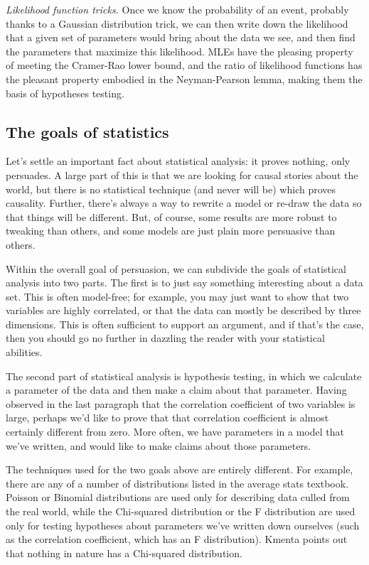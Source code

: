 \documentclass[12pt,notitlepage, openany]{book}
\begin{document}
{\it Likelihood function tricks.} Once we know the probability of an
event, probably thanks to a Gaussian distribution trick, we can then
write down the likelihood that a given set of parameters would bring
about the data we see, and then find the parameters that maximize this
likelihood. MLEs have the pleasing property of meeting the Cramer-Rao
lower bound, and the ratio of likelihood functions has the pleasant
property embodied in the Neyman-Pearson lemma, making them the basis of
hypotheses testing.

\subsection{The goals of statistics} Let's settle an
important fact about statistical analysis: it proves nothing, only
persuades. A large part of this is that we are looking for causal stories
about the world, but there is no statistical technique (and never will be)
which proves causality. Further, there's always a way to rewrite a model
or re-draw the data so that things will be different. But, of course,
some results are more robust to tweaking 
than others, and some models are just plain more persuasive than others.

Within the overall goal of persuasion, we can subdivide the goals of
statistical analysis into two parts. The first is to just say something
interesting about a data set. This is often model-free; for example,
you may just want to show that two variables are highly correlated, or
that the data can mostly be described by three dimensions. This is often
sufficient to support an argument, and if that's the case, then you should
go no further in dazzling the reader with your statistical abilities.

The second part of statistical analysis is hypothesis testing, in which
we calculate a parameter of the data and then make a claim about that
parameter.  Having observed in the last paragraph that the correlation
coefficient of two variables is large, perhaps we'd like to prove
that that correlation coefficient is almost certainly different from
zero. More often, we have parameters in a model that we've written,
and would like to make claims about those parameters.

The techniques used for the two goals above are entirely different. For
example, there are any of a number of distributions listed in the
average stats textbook.  Poisson or Binomial distributions are used
only for describing data culled from the real world, while the Chi-squared
distribution or the F distribution are used only for testing hypotheses
about parameters we've written down ourselves (such as the correlation
coefficient, which has an F distribution). Kmenta points out that nothing
in nature has a Chi-squared distribution. 
\end{document}
